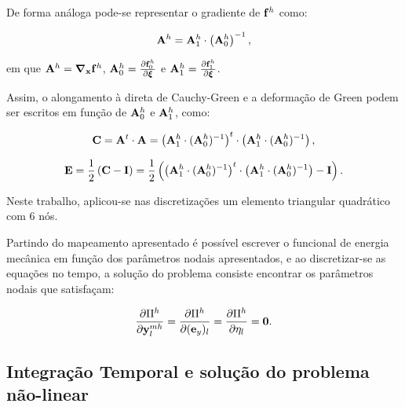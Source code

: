 De forma análoga pode-se representar o gradiente de  $\mathbf{f}^{h}$ como:

\begin{align}
\mathbf{A}^{h} = \mathbf{A}^{h}_{1} \cdot \left(\mathbf{A}^{h}_{0}\right)^{-1} \label{eq:gradDeformation},
\end{align}

\noindent em que $\mathbf{A}^{h} = \boldsymbol{\nabla}_{\mathbf{x}} \mathbf{f}^{h}$, $\mathbf{A}^{h}_{0} = \frac{\partial  \mathbf{f}^{h}_{0}} {\partial \boldsymbol{\xi}}$ e  $\mathbf{A}^{h}_{1} =  \frac{\partial  \mathbf{f}^{h}_{1}} {\partial \boldsymbol{\xi}}$.

Assim, o alongamento à direta de Cauchy-Green e a deformação de Green podem ser escritos em função de $\mathbf{A}^{h}_{0}$ e $\mathbf{A}^{h}_{1}$, como:

\begin{align}
	\mathbf{C} = \mathbf{A}^{t} \cdot \mathbf{A} = \left(\mathbf{A}^{h}_{1} \cdot (\mathbf{A}^{h}_{0})^{-1}\right)^{t} \cdot \left(\mathbf{A}^{h}_{1} \cdot (\mathbf{A}^{h}_{0})^{-1}\right),
\end{align}

\begin{align}
	\mathbf{E} = \frac{1}{2}\left(\mathbf{C} - \mathbf{I}\right) = \frac{1}{2}\left(\left(\mathbf{A}^{h}_{1} \cdot (\mathbf{A}^{h}_{0})^{-1}\right)^{t} \cdot \left(\mathbf{A}^{h}_{1} \cdot (\mathbf{A}^{h}_{0})^{-1}\right) - \mathbf{I}\right).
\end{align}

Neste trabalho, aplicou-se nas discretizações um elemento triangular quadrático com 6 nós.

Partindo do mapeamento apresentado é possível escrever o funcional de energia mecânica em função dos parâmetros nodais apresentados, e ao discretizar-se as equações no tempo, a solução do problema consiste encontrar os parâmetros nodais que satisfaçam:

\begin{align}
	\frac{\partial\Pi^{h}}{\partial \mathbf{y}_{l}^{mh}} = \frac{\partial\Pi^{h}}{\partial (\mathbf{e}_y)_l} = \frac{\partial\Pi^{h}}{\partial \eta_l} = \mathbf{0}.
\end{align}

\subsection{Integração Temporal e solução do problema não-linear}

